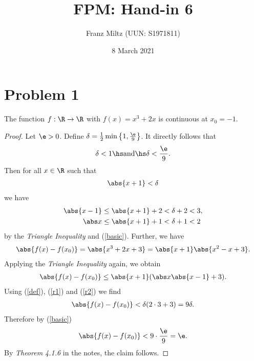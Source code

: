 \documentclass{article}
\begin{document}
\title{FPM: Hand-in 6}
\author{Franz Miltz (UUN: S1971811)}
\date{8 March 2021}
\maketitle
\mkthms

\section*{Problem 1}

\begin{claim*}
    The function $f:\R\to\R$ with $f(x) = x^3+2x$ is continuous at $x_0=-1$.
\end{claim*}
\begin{proof}
    Let $\e>0$. Define $\delta = \frac{1}{2}\min\left\lbrace1,\frac{\e}{9}\right\rbrace$. It directly follows that
    \begin{align}
        \label{basic}
        \delta< 1\hs\text{and}\hs \delta <\frac{\e}{9}.
    \end{align}
    Then for all $x\in\R$ such that
    \begin{align}
        \label{def}
        \abs{x+1}<\delta
    \end{align}
    we have
    \begin{align}
        \label{r1}
        \abs{x-1} & \leq \abs{x+1} + 2 < \delta + 2 < 3, \\
        \label{r2}
        \abs x    & \leq \abs{x+1}+1 < \delta + 1 < 2
    \end{align}
    by the \emph{Triangle Inequality} and (\ref{basic}). Further, we have
    \begin{align*}
        \abs{f(x)-f(x_0)}=\abs{x^3+2x+3}=\abs{x+1}\abs{x^2-x+3}.
    \end{align*}
    Applying the \emph{Triangle Inequality} again, we obtain
    \begin{align*}
        \abs{f(x)-f(x_0)}\leq \abs{x+1}(\abs x\abs{x-1}+3).
    \end{align*}
    Using (\ref{def}), (\ref{r1}) and (\ref{r2}) we find
    \begin{align*}
        \abs{f(x)-f(x_0)} < \delta (2\cdot 3 + 3) = 9\delta.
    \end{align*}
    Therefore by (\ref{basic})
    \begin{align*}
        \abs{f(x)-f(x_0)} < 9\cdot\frac{\e}{9}=\e.
    \end{align*}
    By \emph{Theorem 4.1.6} in the notes, the claim follows.
\end{proof}
\end{document}
